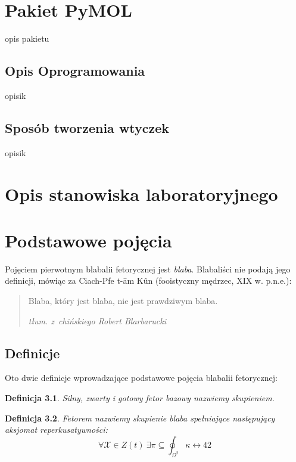 \documentclass[licencjacka]{pracamgr}
\newtheorem{defi}{Definicja}[section]
\begin{document}
\chapter{Pakiet PyMOL}
opis pakietu

\section{Opis Oprogramowania}
opisik

\section{Sposób tworzenia wtyczek}
opisik

\chapter{Opis stanowiska laboratoryjnego}


\iffalse
\chapter{Podstawowe pojęcia}\label{r:pojecia}

Pojęciem pierwotnym blabalii fetorycznej jest \emph{blaba}.
Blabaliści nie podają jego definicji, mówiąc za Ciach-Pfe t-\=am
K\^un (fooistyczny mędrzec, XIX w. p.n.e.):
\begin{quote}
  Blaba, który jest blaba, nie jest prawdziwym blaba.

\raggedleft\slshape tłum. z~chińskiego Robert Blarbarucki
\end{quote}

\section{Definicje}

Oto dwie definicje wprowadzające podstawowe pojęcia blabalii
fetorycznej:

\begin{defi}\label{skupienie}
  Silny, zwarty i gotowy fetor bazowy nazwiemy \emph{skupieniem}.
\end{defi}

\begin{defi}\label{fetor}
  \emph{Fetorem} nazwiemy skupienie blaba spełniające następujący
  \emph{aksjomat reperkusatywności}:
  $$\forall \mathcal{X}\in Z(t)\ \exists
  \pi\subseteq\oint_{\Omega^2}\kappa\leftrightarrow 42$$
\end{defi}
\end{document}
